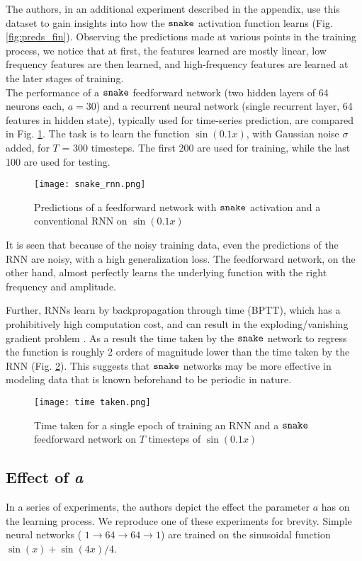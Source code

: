 The authors, in an additional experiment described in the appendix, use this dataset to gain insights into how the $ \operatorname{\texttt{snake}} $ activation function learns (Fig. \ref{fig:preds_fin}).
Observing the predictions made at various points in the training process, we notice that at first, the features learned are mostly linear, low frequency features are then learned, and high-frequency features are learned at the later stages of training. \\

 The performance of a $ \operatorname{\texttt{snake}} $ feedforward network (two hidden layers of 64 neurons each, $a=30$) and a recurrent neural network (single recurrent layer, 64 features in hidden state), typically used for time-series prediction, are compared in Fig. \ref{fig:rnn_preds}. The task is to learn the function $\sin(0.1x)$, with Gaussian noise $\sigma$ added, for $T$ = 300 timesteps. The first 200 are used for training, while the last 100 are used for testing.

\begin{figure}[h]
\centering
\texttt{[image: snake\_rnn.png]}
\caption{Predictions of a feedforward network with $ \operatorname{\texttt{snake}} $ activation and a conventional RNN on $\sin(0.1x)$}
\label{fig:rnn_preds}
\end{figure}

It is seen that because of the noisy training data, even the predictions of the RNN are noisy, with a high generalization loss. The feedforward network, on the other hand, almost perfectly learns the underlying function with the right frequency and amplitude.

Further, RNNs learn by backpropagation through time (BPTT), which has a prohibitively high computation cost, and can result in the exploding/vanishing gradient problem \cite{pascanu2013difficulty}. As a result the time taken by the $ \operatorname{\texttt{snake}} $ network to regress the function is roughly 2 orders of magnitude lower than the time taken by the RNN (Fig. \ref{fig:rnn_time}). This suggests that $ \operatorname{\texttt{snake}} $ networks may be more effective in modeling data that is known beforehand to be periodic in nature.

\begin{figure}[h]
\centering
\texttt{[image: time taken.png]}
\caption{Time taken for a single epoch of training an RNN and a $ \operatorname{\texttt{snake}} $ feedforward network on $T$ timesteps of $\sin(0.1x)$}
\label{fig:rnn_time}
\end{figure}

\subsection{Effect of \textbf{\textit{a}}}
In a series of experiments, the authors depict the effect the parameter $a$ has on the learning process. We reproduce one of these experiments for brevity. Simple neural networks ( $ 1 \rightarrow 64 \rightarrow 64 \rightarrow 1 $) are trained on the sinusoidal function $\sin(x) + \sin(4x)/4$.

